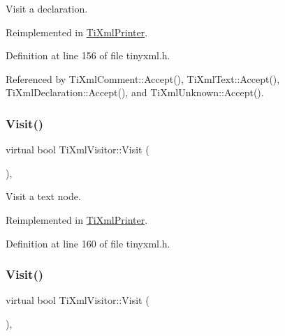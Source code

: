 Visit a declaration. 



Reimplemented in \hyperlink{class_ti_xml_printer_adaf7eec4dc43ad071ff52b60361574f5}{Ti\+Xml\+Printer}.



Definition at line 156 of file tinyxml.\+h.



Referenced by Ti\+Xml\+Comment\+::\+Accept(), Ti\+Xml\+Text\+::\+Accept(), Ti\+Xml\+Declaration\+::\+Accept(), and Ti\+Xml\+Unknown\+::\+Accept().

\hypertarget{class_ti_xml_visitor_a399b8ebca5cd14664974a32d2ce029e5}{}\label{class_ti_xml_visitor_a399b8ebca5cd14664974a32d2ce029e5} 
\subsubsection{\texorpdfstring{Visit()}{Visit()}\hspace{0.1cm}{\footnotesize\ttfamily [2/4]}}
{\footnotesize\ttfamily virtual bool Ti\+Xml\+Visitor\+::\+Visit (\begin{DoxyParamCaption}\item[{const \hyperlink{class_ti_xml_text}{Ti\+Xml\+Text} \&}]{ }\end{DoxyParamCaption})\hspace{0.3cm}{\ttfamily [inline]}, {\ttfamily [virtual]}}



Visit a text node. 



Reimplemented in \hyperlink{class_ti_xml_printer_a0857c5d32c59b9a257f9a49cb9411df5}{Ti\+Xml\+Printer}.



Definition at line 160 of file tinyxml.\+h.

\hypertarget{class_ti_xml_visitor_a53a60e7a528627b31af3161972cc7fa2}{}\label{class_ti_xml_visitor_a53a60e7a528627b31af3161972cc7fa2} 
\subsubsection{\texorpdfstring{Visit()}{Visit()}\hspace{0.1cm}{\footnotesize\ttfamily [3/4]}}
{\footnotesize\ttfamily virtual bool Ti\+Xml\+Visitor\+::\+Visit (\begin{DoxyParamCaption}\item[{const \hyperlink{class_ti_xml_comment}{Ti\+Xml\+Comment} \&}]{ }\end{DoxyParamCaption})\hspace{0.3cm}{\ttfamily [inline]}, {\ttfamily [virtual]}}



